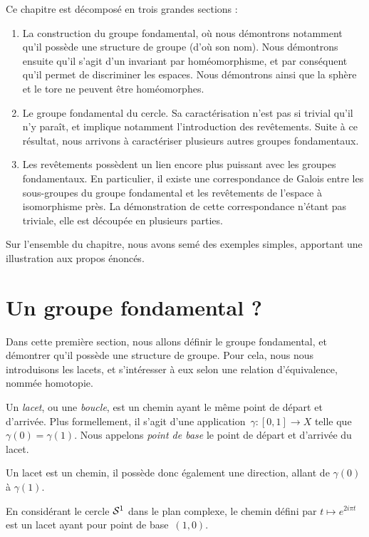 Ce chapitre est décomposé en trois grandes sections : \begin{enumerate}
    \item La construction du groupe fondamental, où nous démontrons notamment qu'il possède une structure de groupe (d'où son nom). Nous démontrons ensuite qu'il s'agit d'un invariant par homéomorphisme, et par conséquent qu'il permet de discriminer les espaces. Nous démontrons ainsi que la sphère et le tore ne peuvent être homéomorphes.
    \item Le groupe fondamental du cercle. Sa caractérisation n'est pas si trivial qu'il n'y paraît, et implique notamment l'introduction des revêtements. Suite à ce résultat, nous arrivons à caractériser plusieurs autres groupes fondamentaux.
    \item Les revêtements possèdent un lien encore plus puissant avec les groupes fondamentaux. En particulier, il existe une correspondance de Galois entre les sous-groupes du groupe fondamental et les revêtements de l'espace à isomorphisme près. La démonstration de cette correspondance n'étant pas triviale, elle est découpée en plusieurs parties. 
\end{enumerate}

Sur l'ensemble du chapitre, nous avons semé des exemples simples, apportant une illustration aux propos énoncés.

\section{Un groupe fondamental ?}

Dans cette première section, nous allons définir le groupe fondamental, et démontrer qu'il possède une structure de groupe. Pour cela, nous nous introduisons les lacets, et s'intéresser à eux selon une relation d'équivalence, nommée homotopie.

\begin{definition}\label{def:loops}
Un \emph{lacet}, ou une \emph{boucle}, est un chemin ayant le même point de départ et d'arrivée. Plus formellement, il s'agit d'une application~$\gamma:[0,1]\to X$ telle que~$\gamma(0)=\gamma(1)$. Nous appelons \emph{point de base} le point de départ et d'arrivée du lacet.
\end{definition}

Un lacet est un chemin, il possède donc également une direction, allant de $\gamma(0)$ à $\gamma(1)$.

\begin{exemple}
En considérant le cercle $\mathcal{S}^{1}$ dans le plan complexe, le chemin défini par $t\mapsto e^{2i\pi t}$ est un lacet ayant pour point de base~$(1,0)$.
\end{exemple}

